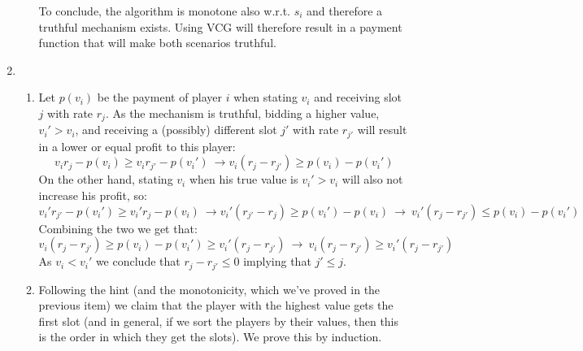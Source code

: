 \documentclass[a4page,notitlepage]{article}
\begin{document}
\begin{enumerate}
\begin{enumerate}
        To conclude, the algorithm is monotone also w.r.t. $s_i$ and therefore a truthful mechanism exists.
        Using VCG will therefore result in a payment function that will make both scenarios truthful.
  \end{enumerate}
  \item
    \begin{enumerate}
    \item 
      Let $p(v_i)$ be the payment of player $i$ when stating $v_i$ and receiving slot $j$ with rate $r_j$.
      As the mechanism is truthful, bidding a higher value, $v_i'>v_i$, and receiving a (possibly) different slot $j'$ with rate $r_{j'}$ will result in a lower or equal profit to this player:
      \begin{equation*}
        v_ir_j-p(v_i)\geq v_ir_{j'}-p(v_i')\ \rightarrow v_i(r_j-r_{j'})\geq p(v_i)-p(v_i')
      \end{equation*}
      On the other hand, stating $v_i$ when his true value is $v_i'>v_i$ will also not increase his profit, so:
      \begin{equation*}
        v_i'r_{j'}-p(v_i')\geq v_i'r_j-p(v_i)\ \rightarrow v_i'(r_{j'}-r_j)\geq p(v_i')-p(v_i)\ \rightarrow \ v_i'(r_j-r_{j'})\leq p(v_i)-p(v_i')
      \end{equation*}
      Combining the two we get that:
      \begin{equation*}
        v_i(r_j-r_{j'})\geq p(v_i)-p(v_i')\geq v_i'(r_j-r_{j'})\ \rightarrow \ v_i(r_j-r_{j'})\geq v_i'(r_j-r_{j'})
      \end{equation*}
      As $v_i < v_i'$ we conclude that $r_j-r_{j'}\leq 0$ implying that $j'\leq j$.
    \item
      Following the hint (and the monotonicity, which we've proved in the previous item) we claim that the player with the highest value gets the first slot (and in general, if we sort the players by their values, then this is the order in which they get the slots).
      We prove this by induction.


\end{enumerate}
\end{enumerate}
\end{document}
